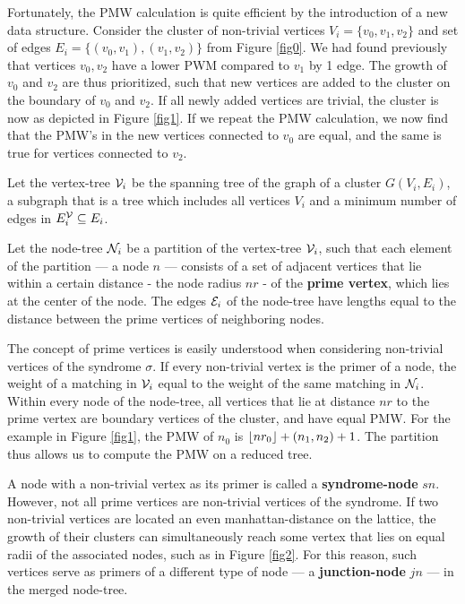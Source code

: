 Fortunately, the PMW calculation is quite efficient by the introduction of a new data structure. Consider the cluster of non-trivial vertices $V_i=\{v_0,v_1,v_2\}$ and set of edges $E_i = \{(v_0,v_1), (v_1, v_2)\}$ from Figure \ref{fig0}. We had found previously that vertices $v_0, v_2$ have a lower PWM compared to $v_1$ by 1 edge. The growth of $v_0$ and $v_2$ are thus prioritized, such that new vertices are added to the cluster on the boundary of $v_0$ and $v_2$. If all newly added vertices are trivial, the cluster is now as depicted in Figure \ref{fig1}. If we repeat the PMW calculation, we now find that the PMW's in the new vertices connected to $v_0$ are equal, and the same is true for vertices connected to $v_2$. 
\begin{definition}
    Let the vertex-tree $\mathcal{V}_i$ be the spanning tree of the graph of a cluster $G(V_i, E_i)$, a subgraph that is a tree which includes all vertices $V_i$ and a minimum number of edges in $E^{\mathcal{V}}_i \subseteq E_i$. 
\end{definition}
\begin{definition}
  Let the node-tree $\mathcal{N}_i$ be a partition of the vertex-tree $\mathcal{V}_i$, such that each element of the partition --- a node $n$ --- consists of a set of adjacent vertices that lie within a certain distance - the node radius $nr$ - of the \textbf{prime vertex}, which lies at the center of the node. The edges $\mathcal{E}_i$ of the node-tree have lengths equal to the distance between the prime vertices of neighboring nodes. 
\end{definition}

The concept of prime vertices is easily understood when considering non-trivial vertices of the syndrome $\sigma$. If every non-trivial vertex is the primer of a node, the weight of a matching in $\mathcal{V}_i$ equal to the weight of the same matching in $\mathcal{N}_i$. Within every node of the node-tree, all vertices that lie at distance $nr$ to the prime vertex are boundary vertices of the cluster, and have equal PMW. For the example in Figure \ref{fig1}, the PMW of $n_0$ is ${\left \lfloor nr_0 \right \rfloor } + (n_1, n_2) + 1$. The partition thus allows us to compute the PMW on a reduced tree. 

A node with a non-trivial vertex as its primer is called a \textbf{syndrome-node} $sn$. However, not all prime vertices are non-trivial vertices of the syndrome. If two non-trivial vertices are located an even manhattan-distance on the lattice, the growth of their clusters can simultaneously reach some vertex that lies on equal radii of the associated nodes, such as in Figure \ref{fig2}. For this reason, such vertices serve as primers of a different type of node --- a \textbf{junction-node} $jn$ --- in the merged node-tree. 

